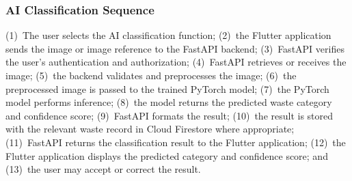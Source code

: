 \subsubsection{AI Classification Sequence}
(1)~The user selects the AI classification function; (2)~the Flutter
application sends the image or image reference to the FastAPI backend;
(3)~FastAPI verifies the user's authentication and authorization; (4)~FastAPI
retrieves or receives the image; (5)~the backend validates and preprocesses the
image; (6)~the preprocessed image is passed to the trained PyTorch model;
(7)~the PyTorch model performs inference; (8)~the model returns the
predicted waste category and confidence score; (9)~FastAPI formats the
result; (10)~the result is stored with the relevant waste record in Cloud
Firestore where appropriate; (11)~FastAPI returns the classification result to
the Flutter application; (12)~the Flutter application displays the predicted
category and confidence score; and (13)~the user may accept or correct the
result.

